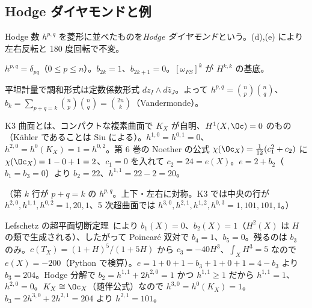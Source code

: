 \subsection{Hodge ダイヤモンドと例}
Hodge 数 $h^{p,q}$ を菱形に並べたものを\emph{Hodge ダイヤモンド}という。(d),(e) により左右反転と 180 度回転で不変。
\begin{ex}[$\CP^n$]
$h^{p,q}=\delta_{pq}$（$0\le p\le n$）。$b_{2k}=1$、$b_{2k+1}=0$。$[\omega_{FS}]^k$ が $H^{k,k}$ の基底。
\end{ex}
\begin{ex}[複素トーラス $T=\C^n/\Gamma$]\label{ex:torusH}
平坦計量で調和形式は定数係数形式 $dz_I\wedge d\bar z_J$。よって $h^{p,q}=\binom np\binom nq$、$b_k=\sum_{p+q=k}\binom np\binom nq=\binom{2n}k$（Vandermonde）。
\end{ex}
\begin{ex}[K3 曲面]\label{ex:K3}
K3 曲面とは、コンパクトな複素曲面で $K_X$ が自明、$H^1(X,\Oc)=0$ のもの（Kähler であることは Siu による\tC）。$h^{1,0}=h^{0,1}=0$、$h^{2,0}=h^0(K_X)=1=h^{0,2}$。第 6 巻の Noether の公式 $\chi(\Oc_X)=\frac1{12}(c_1^2+c_2)$ に $\chi(\Oc_X)=1-0+1=2$、$c_1=0$ を入れて $c_2=24=e(X)$。$e=2+b_2$（$b_1=b_3=0$）より $b_2=22$、$h^{1,1}=22-2=20$。
\begin{center}
\end{center}
（第 $k$ 行が $p+q=k$ の $h^{p,q}$。上下・左右に対称。K3 では中央の行が $h^{2,0},h^{1,1},h^{0,2}=1,20,1$、5 次超曲面では $h^{3,0},h^{2,1},h^{1,2},h^{0,3}=1,101,101,1$。）
\end{ex}
\begin{ex}\label{ex:quintic}
Lefschetz の超平面切断定理\tC\ により $b_1(X)=0$、$b_2(X)=1$（$H^2(X)$ は $H$ の類で生成される）、したがって Poincaré 双対で $b_4=1$、$b_5=0$。残るのは $b_3$ のみ。$c(T_X)=(1+H)^5/(1+5H)$ から $c_3=-40H^3$、$\int_XH^3=5$ なので $e(X)=-200$（Python で検算）。$e=1+0+1-b_3+1+0+1=4-b_3$ より $b_3=204$。Hodge 分解で $b_2=h^{1,1}+2h^{2,0}=1$ かつ $h^{1,1}\ge1$ だから $h^{1,1}=1$、$h^{2,0}=0$。$K_X\cong\Oc_X$（随伴公式）なので $h^{3,0}=h^0(K_X)=1$。$b_3=2h^{3,0}+2h^{2,1}=204$ より $h^{2,1}=101$。
\end{ex}
